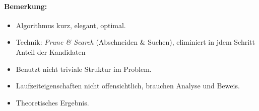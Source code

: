 \begin{description}
		\paragraph*{Bemerkung:}
		\begin{itemize}
		 \item Algorithmus kurz, elegant, optimal.
		 \item Technik: \emph{Prune \& Search} (Abschneiden \& Suchen), eliminiert in jdem Schritt Anteil der Kandidaten
		 \item Benutzt nicht triviale Struktur im Problem.
		 \item Laufzeiteigenschaften nicht offensichtlich, brauchen Analyse und Beweis.
		 \item Theoretisches Ergebnis.
		\end{itemize}

\end{description}

